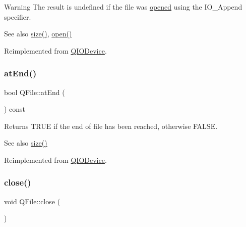 \begin{DoxyWarning}{Warning}
The result is undefined if the file was \mbox{\hyperlink{class_q_file_af10aeafc303904f98b74be9752d2aa43}{opened}} using the {\ttfamily I\+O\+\_\+\+Append} specifier.
\end{DoxyWarning}
\begin{DoxySeeAlso}{See also}
\mbox{\hyperlink{class_q_file_ae6d2d1ffc423701e6acfc7be48a11e73}{size()}}, \mbox{\hyperlink{class_q_file_af10aeafc303904f98b74be9752d2aa43}{open()}} 
\end{DoxySeeAlso}


Reimplemented from \mbox{\hyperlink{class_q_i_o_device_a14643fc1c2e05c2addd1ecc03bd98017}{Q\+I\+O\+Device}}.

\mbox{\label{class_q_file_a285a896990bd1779c7b3a7066142446b}} 
\subsubsection{\texorpdfstring{atEnd()}{atEnd()}}
{\footnotesize\ttfamily bool Q\+File\+::at\+End (\begin{DoxyParamCaption}{ }\end{DoxyParamCaption}) const\hspace{0.3cm}{\ttfamily [virtual]}}

Returns T\+R\+UE if the end of file has been reached, otherwise F\+A\+L\+SE. \begin{DoxySeeAlso}{See also}
\mbox{\hyperlink{class_q_file_ae6d2d1ffc423701e6acfc7be48a11e73}{size()}} 
\end{DoxySeeAlso}


Reimplemented from \mbox{\hyperlink{class_q_i_o_device_ac5a3fcc9349a98d8f260039c5fd58812}{Q\+I\+O\+Device}}.

\mbox{\label{class_q_file_ac0d8375a5ea7d4503545d7c68dcf58e1}} 
\subsubsection{\texorpdfstring{close()}{close()}}
{\footnotesize\ttfamily void Q\+File\+::close (\begin{DoxyParamCaption}{ }\end{DoxyParamCaption})\hspace{0.3cm}{\ttfamily [virtual]}}

